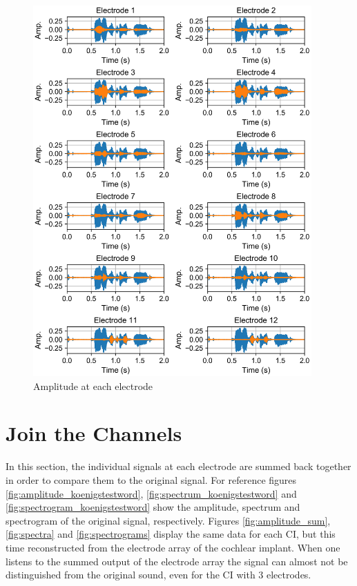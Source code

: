 \documentclass{scrartcl}
\begin{document}
\begin{figure}[p]
	\centering
	\includegraphics[width=0.95\textwidth]{figures/filtered_all}
	\caption{Amplitude at each electrode}
	\label{fig:filtered_all}
\end{figure}

\newpage
\section{Join the Channels}

In this section, the individual signals at each electrode are summed back together in order to compare them to the original signal. For reference figures \ref{fig:amplitude_koenigstestword}, \ref{fig:spectrum_koenigstestword} and \ref{fig:spectrogram_koenigstestword} show the amplitude, spectrum and spectrogram of the original signal, respectively. Figures \ref{fig:amplitude_sum}, \ref{fig:spectra} and \ref{fig:spectrograms} display the same data for each CI, but this time reconstructed from the electrode array of the cochlear implant. When one listens to the summed output of the electrode array the signal can almost not be distinguished from the original sound, even for the CI with 3 electrodes. 
\end{document}
